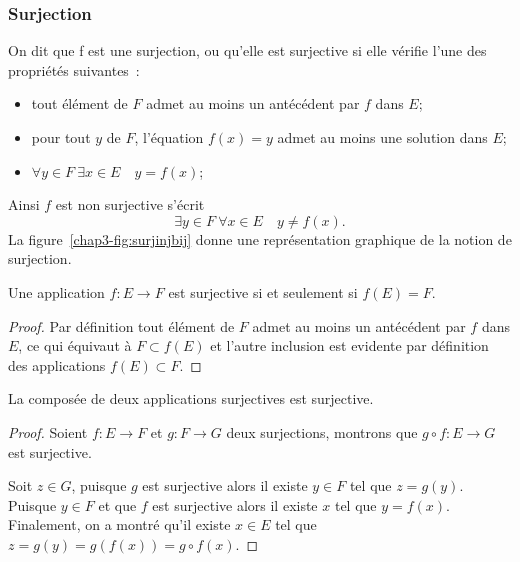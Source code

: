 \subsubsection{Surjection}
\label{chap3-subsubsec:surjection}
\begin{defdef}
  On dit que f est une surjection, ou qu'elle est surjective si elle vérifie l'une des propriétés suivantes~:
  \begin{itemize}
  \item tout élément de $F$ admet au moins un antécédent par $f$ dans $E$;
  \item pour tout $y$ de $F$, l'équation $f(x)=y$ admet au moins une solution dans $E$;
  \item $\forall y \in F \ \exists x \in E \quad y=f(x)$;
  \end{itemize}
  Ainsi $f$ est non surjective s'écrit
  \begin{equation}
    \exists y \in F \ \forall x \in E \quad y \neq f(x).
  \end{equation}
  La figure~\ref{chap3-fig:surjinjbij} donne une représentation graphique de la notion de surjection.
\end{defdef}
\begin{prop}
  Une application $f:E \longrightarrow F$ est surjective si et seulement si $f(E)=F$.
\end{prop}
\begin{proof}
    Par définition tout élément de $F$ admet au moins un antécédent par $f$ dans $E$, ce qui équivaut à $F \subset f(E)$ et l'autre inclusion est evidente par définition des applications $f(E) \subset F$.
\end{proof}
\begin{theo}
  La composée de deux applications surjectives est surjective.
\end{theo}
\begin{proof}
  Soient $f:E \longrightarrow F$ et $g:F \longrightarrow G$ deux surjections, montrons que $g \circ f: E \longrightarrow G$ est surjective. 

  Soit $z \in G$, puisque $g$ est surjective alors il existe $y \in F$ tel que $z=g(y)$. Puisque $y \in F$ et que $f$ est surjective alors il existe $x$ tel que $y=f(x)$. Finalement, on a montré qu'il existe $x \in E$ tel que $z=g(y)=g(f(x))= g \circ f(x)$.
\end{proof}
%
